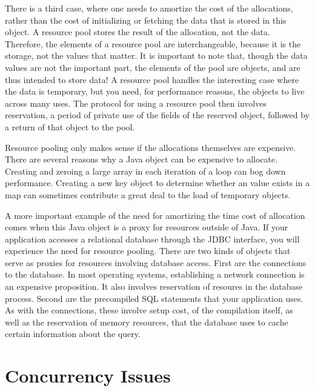  There is a third case,
where one needs to amortize the cost of the allocations, rather than the cost of
initializing or fetching the data that is stored in this object. A resource pool
stores the result of the allocation, not the data. Therefore, the elements of a
resource pool are interchangeable, because it is the storage, not the values that
matter. It is important to note that, though the data values are not the
important part, the elements of the pool are objects, and are thus intended to
store data! A resource pool handles the interesting case where the data is
temporary, but you need, for performance reasons, the objects to live across many
uses. The protocol for using a resource pool then involves reservation, a period
of private use of the fields of the reserved object, followed by a return of that
object to the pool.

Resource pooling only makes sense if the allocations themselves are expensive.
There are several reasons why a Java object can be expensive to allocate.
Creating and zeroing a large array in each iteration of a
loop can bog down performance. Creating a new key object to determine whether an
value exists in a map can sometimes contribute a great deal to the load of
temporary objects.

A more important example of the need for amortizing the time cost of allocation
comes when this Java object is a proxy for resources outside of Java. If your
application accesses a relational database through the JDBC
interface, you will experience the need for resource pooling. There are two kinds
of objects that serve as proxies for resources involving database access. First
are the connections to the database. In most operating systems, establishing a
network connection is an expensive proposition. It also involves reservation of
resoures in the database process. Second are the precompiled SQL statements that
your application uses. As with the connections, these involve setup cost, of the
compilation itself, as well as the reservation of memory resources, that the
database uses to cache certain information about the query.





\section{Concurrency Issues}
\label{sec:lifetime-management-concurrency-issues}


